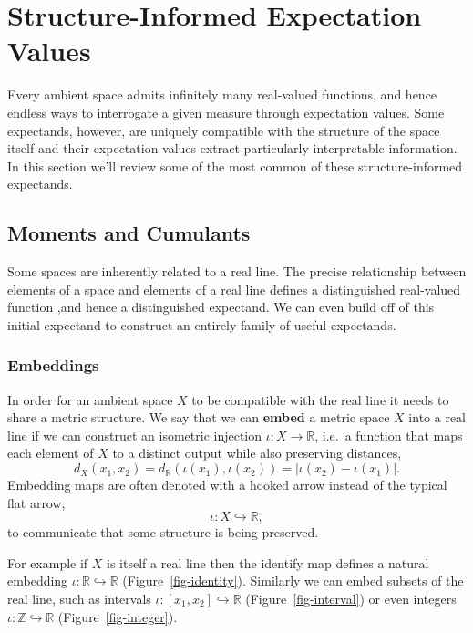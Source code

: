 \documentclass[
  letterpaper,
  DIV=11,
  numbers=noendperiod]{scrartcl}
\begin{document}
\hypertarget{structure-informed-expectation-values}{%
\section{Structure-Informed Expectation
Values}\label{structure-informed-expectation-values}}

Every ambient space admits infinitely many real-valued functions, and
hence endless ways to interrogate a given measure through expectation
values. Some expectands, however, are uniquely compatible with the
structure of the space itself and their expectation values extract
particularly interpretable information. In this section we'll review
some of the most common of these structure-informed expectands.

\hypertarget{moments-and-cumulants}{%
\subsection{Moments and Cumulants}\label{moments-and-cumulants}}

Some spaces are inherently related to a real line. The precise
relationship between elements of a space and elements of a real line
defines a distinguished real-valued function ,and hence a distinguished
expectand. We can even build off of this initial expectand to construct
an entirely family of useful expectands.

\hypertarget{embeddings}{%
\subsubsection{Embeddings}\label{embeddings}}

In order for an ambient space \(X\) to be compatible with the real line
it needs to share a metric structure. We say that we can \textbf{embed}
a metric space \(X\) into a real line if we can construct an isometric
injection \(\iota : X \rightarrow \mathbb{R}\), i.e.~a function that
maps each element of \(X\) to a distinct output while also preserving
distances, \[
d_{X}(x_{1}, x_{2})
= d_{\mathbb{R}}(\iota(x_{1}), \iota(x_{2}))
= | \iota(x_{2}) - \iota(x_{1}) |.
\] Embedding maps are often denoted with a hooked arrow instead of the
typical flat arrow, \[
\iota : X \hookrightarrow \mathbb{R},
\] to communicate that some structure is being preserved.

For example if \(X\) is itself a real line then the identify map defines
a natural embedding \(\iota : \mathbb{R} \hookrightarrow \mathbb{R}\)
(Figure~\ref{fig-identity}). Similarly we can embed subsets of the real
line, such as intervals
\(\iota : [x_{1}, x_{2}] \hookrightarrow \mathbb{R}\)
(Figure~\ref{fig-interval}) or even integers
\(\iota : \mathbb{Z} \hookrightarrow \mathbb{R}\)
(Figure~\ref{fig-integer}).
\end{document}
